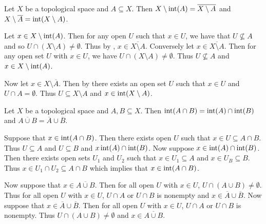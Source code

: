 \documentclass[letterpaper, 11pt, oneside]{book}
\begin{document}
\begin{prop}
  Let $X$ be a topological space and $A \subseteq X$.
  Then $X \setminus \operatorname{int}(A) = \overline{X \setminus A}$ and $X \setminus \overline{A} = \operatorname{int}(X \setminus A)$.
\end{prop}
\begin{pf}
  Let $x \in X \setminus \operatorname{int}(A)$.
  Then for any open $U$ such that $x \in U$, we have that $U \not\subseteq A$ and so $U \cap (X \setminus A) \neq \emptyset$.
  Thus by , $x \in \overline{X \setminus A}$.
  Conversely let $x \in \overline{X \setminus A}$.
  Then for any open set $U$ with $x \in U$, we have $U \cap (X \setminus A) \neq \emptyset$.
  Thus $U \not\subseteq A$ and $x \in X \setminus \operatorname{int}(A)$.

  Now let $x \in X \setminus \overline{A}$.
  Then by  there exists an open set $U$ such that $x \in U$ and $U \cap A = \emptyset$.
  Thus $U \subseteq X \setminus A$ and $x \in \operatorname{int}(X \setminus A)$.
\end{pf}

\begin{prop}
  Let $X$ be a topological space and $A, B \subseteq X$.
  Then $\operatorname{int}(A \cap B) = \operatorname{int}(A) \cap \operatorname{int}(B)$ and $\overline{A \cup B} = \overline{A} \cup \overline{B}$.
\end{prop}
\begin{pf}
  Suppose that $x \in \operatorname{int}(A \cap B)$.
  Then there exists open $U$ such that $x \in U \subseteq A \cap B$.
  Thus $U \subseteq A$ and $U \subseteq B$ and $x \operatorname{int}(A) \cap \operatorname{int}(B)$.
  Now suppose $x \in \operatorname{int}(A) \cap \operatorname{int}(B)$. Then there exists open sets $U_{1}$ and $U_{2}$ such that $x \in U_{1} \subseteq A$ and $x \in U_{B} \subseteq B$.
  Thus $x \in U_{1} \cap U_{2} \subseteq A \cap B$ which implies that $x \in \operatorname{int}(A \cap B)$.

  Now suppose that $x \in \overline{A \cup B}$.
  Then for all open $U$ with $x \in U$, $U \cap (A \cup B) \neq \emptyset$.
  Thus for all open $U$ with $x \in U$, $U \cap A$ or $U \cap B$ is nonempty and $x \in \overline{A} \cup \overline{B}$.
  Now suppose that $x \in \overline{A} \cup \overline{B}$.
  Then for all open $U$ with $x \in U$, $U \cap A$ or $U \cap B$  is nonempty.
  Thus $U \cap (A \cup B) \neq \emptyset$ and $x \in \overline{A \cup B}$.
\end{pf}

\clearpage
\end{document}
